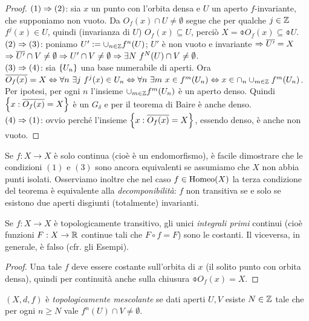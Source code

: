 \begin{proof}$(1)\Rightarrow (2)$: sia $x$ un punto con l'orbita densa e $U$ un aperto $f$-invariante, che supponiamo non vuoto.
Da $O_f(x)\cap U\neq\emptyset$ segue che per qualche $j\in\mathbb{Z}$ $f^j(x)\in U$, quindi (invarianza di $U$) $O_f(x)\subseteq U$,
perciò $X=\obar{O_f(x)}\subseteq\obar{U}$. \\
$(2)\Rightarrow (3)$: poniamo $U':=\cup_{n\in\mathbb{Z}}f^n(U)$; $U'$ è non vuoto e invariante $\Rightarrow\overline{U'}=X$
$\Rightarrow \overline{U'}\cap V\neq\emptyset \Rightarrow U'\cap V\neq\emptyset \Rightarrow \exists N\ f^N(U)\cap V\neq\emptyset$. \\
$(3)\Rightarrow(4)$: sia $\left\{U_n\right\}$ una base numerabile di aperti. Ora $\obar{O_f(x)}=X\sse \forall n\ \exists j\ f^j(x)\in U_n
\sse \forall n\ \exists m\ x\in f^m(U_n)\sse x\in\cap_n\cup_{m\in\Z} f^m(U_n)$.
Per ipotesi, per ogni $n$ l'insieme $\cup_{m\in\mathbb{Z}} f^m(U_n)$ è un aperto denso.
Quindi $\left\{x:\overline{O_f(x)}=X\right\}$ è un $G_\delta$ e per il teorema di Baire è anche denso. \\
$(4)\Rightarrow (1)$: ovvio perché l'insieme $\left\{x:\overline{O_f(x)}=X\right\}$, essendo denso, è anche non vuoto.
\end{proof}

\begin{oss}\label{osstransitivita} Se $f:X\to X$ è solo continua (cioè è un endomorfismo), è facile dimostrare che le condizioni $(1)$ e $(3)$ sono
  ancora equivalenti se assumiamo che $X$ non abbia punti isolati.\newline
  Osserviamo inoltre che nel caso $f\in\operatorname{Homeo} (X)$ la terza condizione del teorema è equivalente alla \emph{decomponibilità}: 
  $f$ non transitiva se e solo se esistono due aperti disgiunti (totalmente) invarianti.
\end{oss}

\begin{prop}Se $f:X\to X$ è topologicamente transitivo, gli unici \emph{integrali primi} continui (cioè
funzioni $F:X\to\mathbb{R}$ continue tali che $F\circ f=F$) sono le costanti. Il viceversa, in generale, è falso (cfr. gli Esempi).
\end{prop}

\begin{proof}Una tale $f$ deve essere costante sull'orbita di $x$ (il solito punto con orbita densa), quindi per continuità anche
sulla chiusura $\obar{O_f(x)}=X$.
\end{proof}

\begin{defi} $(X,d,f)$ è \emph{topologicamente mescolante} se dati aperti $U,V$ esiste $N\in\mathbb{Z}$ tale che per ogni $n\geq N$ vale $f^n(U)\cap V\neq \emptyset$.\end{defi}

